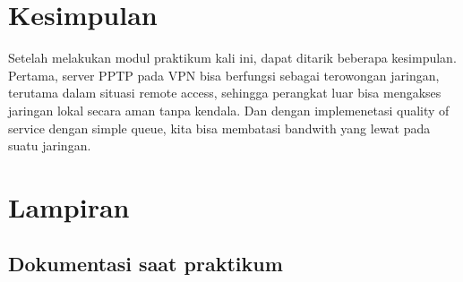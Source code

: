 \section{Kesimpulan}
Setelah melakukan modul praktikum kali ini, dapat ditarik beberapa kesimpulan. Pertama, server PPTP pada VPN bisa berfungsi sebagai terowongan jaringan, terutama dalam situasi remote access, sehingga perangkat luar bisa mengakses jaringan lokal secara aman tanpa kendala. Dan dengan implemenetasi quality of service dengan simple queue, kita bisa membatasi bandwith yang lewat pada suatu jaringan.  

\section{Lampiran}
\subsection{Dokumentasi saat praktikum}
